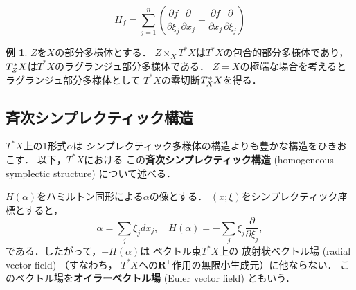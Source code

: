 \documentclass[leqno, 10pt, a4paper, dvipdfmx]{jsarticle}
\theoremstyle{definition}
\newcommand{\rr}{\mathbf{R}}
\numberwithin{equation}{section}
\newcommand{\tpb}[1][]{\mathbin{\mathop{\times}\nolimits_{#1}}}
\theoremstyle{mystyle}
\newtheorem{EG}[AXM]{例}
\newcommand{\cotb}[1][]{T^{\ast}{#1}}
\newcommand{\conm}[2][]{T_{#1}^{\hspace{0.7pt}\ast}{#2}}
\newcommand{\rrp}{\rr^{+}}
\begin{document}
\begin{equation}
    H_f=\sum_{j=1}^{n}\left(
        \frac{\partial f}{\partial\xi_j}
        \frac{\partial }{\partial x_j}
        -
        \frac{\partial f}{\partial x_j}
        \frac{\partial }{\partial\xi_j}
    \right)
\end{equation}

\begin{EG}
    \(Z\)を\(X\)の部分多様体とする．
    \(Z\tpb[X]\cotb[X]\)は\(\cotb[X]\)の包合的部分多様体であり，
    \(\conm[Z]{X}\)は\(\cotb[X]\)のラグランジュ部分多様体である．
    \(Z=X\)の極端な場合を考えるとラグランジュ部分多様体として
    \(\cotb[X]\)の零切断\(\conm[X]{X}\)を得る．
\end{EG}

\subsection*{斉次シンプレクティック構造}
\(\cotb[X]\)上の1形式\(\alpha\)は
シンプレクティック多様体の構造よりも豊かな構造をひきおこす．
以下，\(\cotb[X]\)における
この\textbf{斉次シンプレクティック構造} (homogeneous 
symplectic structure) について述べる．

\(H(\alpha)\)をハミルトン同形による\(\alpha\)の像とする．
\((x;\xi)\)をシンプレクティック座標とすると，
\begin{equation}
    \alpha=\sum_{j}^{}\xi_{j}dx_{j},
    \quad
    H(\alpha)=-\sum_{j}^{}\xi_{j}\frac{\partial}{\partial \xi_{j}},
\end{equation}
である．したがって，\(-H(\alpha)\)は
ベクトル束\(\cotb[X]\)上の
 放射状ベクトル場 (radial vector field) （すなわち，
\(\cotb[X]\)への\(\rrp\)作用の無限小生成元）に他ならない．
このベクトル場を\textbf{オイラーベクトル場} (Euler vector field) ともいう．
\end{document}
